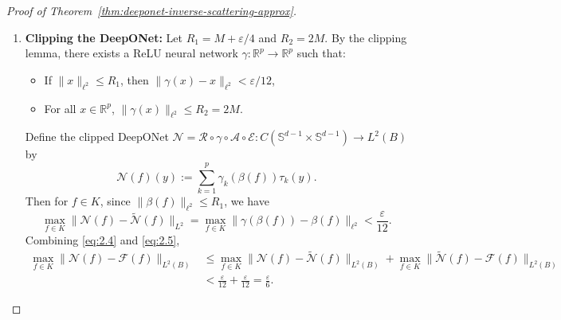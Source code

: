 \documentclass{article}
\numberwithin{equation}{section}
\theoremstyle{plain}
\begin{document}
\begin{proof}[Proof of Theorem~\ref{thm:deeponet-inverse-scattering-approx}]
\begin{enumerate}
			\item \textbf{Clipping the DeepONet:}  
			Let $R_1 = M + \varepsilon/4$ and $R_2 = 2M$. By the clipping lemma, there exists a ReLU neural network $\gamma: \mathbb{R}^p \to \mathbb{R}^p$ such that:
			\begin{itemize}
				\item If $\|x\|_{\ell^2} \leq R_1$, then $\|\gamma(x) - x\|_{\ell^2} < \varepsilon/12$,
				\item For all $x \in \mathbb{R}^p$, $\|\gamma(x)\|_{\ell^2} \leq R_2 = 2M$.
			\end{itemize}
			Define the clipped DeepONet $\mathscr{N} = \mathcal{R} \circ \gamma \circ \mathcal{A} \circ \mathcal{E}: C(\mathbb{S}^{d-1} \times \mathbb{S}^{d-1}) \to L^2(B)$ by
			\begin{equation*}
				\mathscr{N}(f)(y) := \sum_{k=1}^p \gamma_k(\beta(f)) \tau_k(y).
			\end{equation*}
			Then for $f \in K$, since $\|\beta(f)\|_{\ell^2} \leq R_1$, we have
			\begin{equation}
				\max_{f \in K} \| \mathscr{N}(f) - \widetilde{\mathscr{N}}(f) \|_{L^2} = \max_{f \in K} \| \gamma(\beta(f)) - \beta(f) \|_{\ell^2} < \frac{\varepsilon}{12}. \label{eq:2.5}
			\end{equation}
			Combining \eqref{eq:2.4} and \eqref{eq:2.5},
			\begin{equation}
				\begin{aligned}
					\max_{f \in K} \| \mathscr{N}(f) - \mathcal{F}(f) \|_{L^2(B)} 
					&\leq \max_{f \in K} \| \mathscr{N}(f) - \widetilde{\mathscr{N}}(f) \|_{L^2(B)} + \max_{f \in K} \| \widetilde{\mathscr{N}}(f) - \mathcal{F}(f) \|_{L^2(B)} \\ 
					&< \frac{\varepsilon}{12} + \frac{\varepsilon}{12} = \frac{\varepsilon}{6}.
				\end{aligned} \label{eq:2.6}
			\end{equation}
			

\end{enumerate}
\end{proof}
\end{document}

